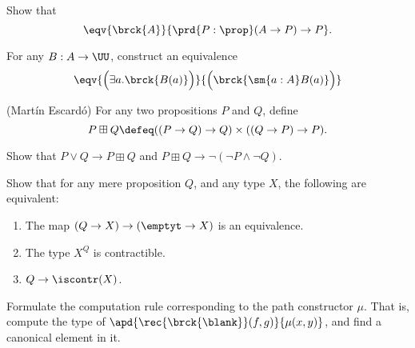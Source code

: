 \begin{exercises}
\item Show that
\begin{equation*}
\eqv{\brck{A}}{\prd{P:\prop}(A\to P)\to P}.
\end{equation*}
\item For any $B:A\to\UU$, construct an equivalence
\begin{equation*}
\eqv{\Big(\exists a.\brck{B(a)}\Big)}{\Big(\brck{\sm{a:A}B(a)}\Big)}
\end{equation*}
\item \label{also}(Mart\'in Escard\'o) For any two propositions $P$ and $Q$, define
\begin{equation*}
P\boxplus Q \defeq ((P\to Q)\to Q)\times ((Q\to P)\to P).
\end{equation*}
\begin{subexenum}
\item Show that $P\lor Q\to P\boxplus Q$ and $P\boxplus Q\to\neg(\neg P\land \neg Q)$.
\end{subexenum}
\item Show that for any mere proposition $Q$, and any type $X$, the following are equivalent:
\begin{enumerate}
\item The map $(Q\to X)\to(\emptyt\to X)$ is an equivalence.
\item The type $X^Q$ is contractible.
\item $Q\to\iscontr(X)$.
\end{enumerate}
\item \label{ex:brck_comp} Formulate the computation rule corresponding to the path constructor $\mu$. That is, compute the type of $\apd{\rec{\brck{\blank}}(f,g)}{\mu(x,y)}$, and find a canonical element in it.
\end{exercises}
